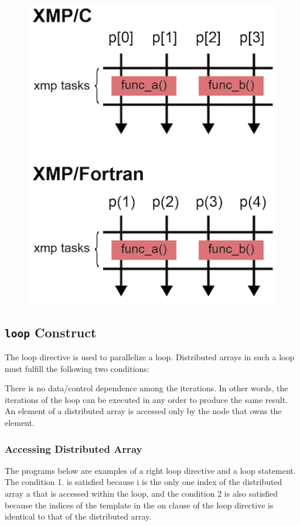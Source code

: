 \begin{figure}
  \centering
  \includegraphics{figs/tasks.png}
\end{figure}


\subsection{{\tt loop} Construct}

The loop directive is used to parallelize a loop. Distributed arrays in
such a loop must fulfill the following two conditions:

There is no data/control dependence among the iterations. In other
words, the iterations of the loop can be executed in any order to
produce the same result.
An element of a distributed array is accessed only by the node that owns
the element.

\subsubsection{Accessing Distributed Array}

The programs below are examples of a right loop directive and a loop
statement. The condition 1. is satisfied because i is the only one index
of the distributed array a that is accessed within the loop, and the
condition 2 is also satisfied because the indices of the template in the
on clause of the loop directive is identical to that of the distributed
array.

